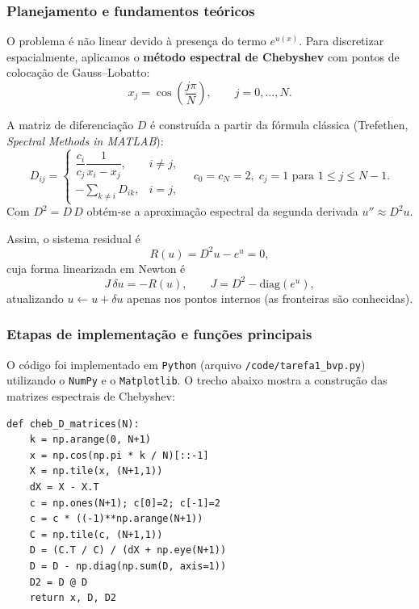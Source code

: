 \documentclass[12pt,a4paper]{article}
\begin{document}
\subsubsection{Planejamento e fundamentos teóricos}
O problema é não linear devido à presença do termo $e^{u(x)}$. Para discretizar espacialmente, aplicamos o \textbf{método espectral de Chebyshev} com pontos de colocação de Gauss--Lobatto:
\begin{equation}
x_j = \cos\!\left(\frac{j\pi}{N}\right), \qquad j = 0,\ldots,N.
\end{equation}

A matriz de diferenciação $D$ é construída a partir da fórmula clássica (Trefethen, \emph{Spectral Methods in MATLAB}):
\begin{equation}
D_{ij} = 
\begin{cases}
\dfrac{c_i}{c_j}\dfrac{1}{x_i-x_j}, & i \neq j,\\[1em]
-\displaystyle\sum_{k\neq i} D_{ik}, & i=j,
\end{cases}
\quad 
c_0=c_N=2,\; c_j=1 \text{ para } 1\le j\le N-1.
\end{equation}
Com $D^2 = D\,D$ obtém-se a aproximação espectral da segunda derivada $u'' \approx D^2 u$.

Assim, o sistema residual é
\begin{equation}
R(u) = D^2 u - e^{u} = 0,
\end{equation}
cuja forma linearizada em Newton é
\begin{equation}
J\,\delta u = -R(u), \qquad J = D^2 - \mathrm{diag}(e^{u}),
\end{equation}
atualizando $u \leftarrow u + \delta u$ apenas nos pontos internos (as fronteiras são conhecidas).

\subsubsection{Etapas de implementação e funções principais}
O código foi implementado em \texttt{Python} (arquivo \texttt{/code/tarefa1\_bvp.py}) utilizando o \texttt{NumPy} e o \texttt{Matplotlib}.  
O trecho abaixo mostra a construção das matrizes espectrais de Chebyshev:

\begin{verbatim}
def cheb_D_matrices(N):
    k = np.arange(0, N+1)
    x = np.cos(np.pi * k / N)[::-1]
    X = np.tile(x, (N+1,1))
    dX = X - X.T
    c = np.ones(N+1); c[0]=2; c[-1]=2
    c = c * ((-1)**np.arange(N+1))
    C = np.tile(c, (N+1,1))
    D = (C.T / C) / (dX + np.eye(N+1))
    D = D - np.diag(np.sum(D, axis=1))
    D2 = D @ D
    return x, D, D2
\end{verbatim}
\end{document}

